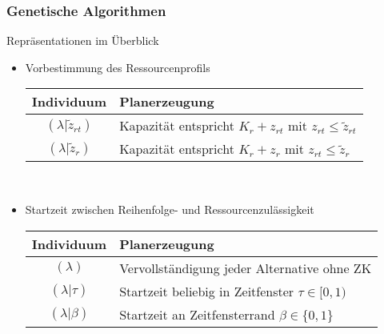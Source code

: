 \begin{frame}
\frametitle{Genetische Algorithmen}
Repräsentationen im Überblick
\begin{itemize}
	\item \small{Vorbestimmung des Ressourcenprofils}\\[2mm]
	\begin{small}
	\begin{tabular}{cp{7.5cm}}
	\hline
	Individuum & Planerzeugung\\
	\hline
	 $(\lambda|\tilde{z}_{rt})$ & Kapazität entspricht $K_r+z_{rt}$ mit $z_{rt} \leq \tilde{z}_{rt}$ \\
	 $(\lambda|\tilde{z}_r)$ & Kapazität entspricht $K_r+z_r$ mit $z_{rt} \leq \tilde{z}_{r}$\\
	\end{tabular}
	\end{small}\\[4mm]

	\item \small{Startzeit zwischen Reihenfolge- und Ressourcenzulässigkeit}\\[2mm]
	\begin{small}
	\begin{tabular}{cp{7.5cm}}
	\hline
	Individuum & Planerzeugung\\
	\hline
	$(\lambda)$ & Vervollständigung jeder Alternative ohne ZK\\	
	$(\lambda|\tau)$& Startzeit beliebig in Zeitfenster $\tau \in [0,1)$\\
	$(\lambda|\beta)$& Startzeit an Zeitfensterrand $\beta \in \{0,1\}$\\
	\end{tabular}
	\end{small}
\end{itemize}
\end{frame}

